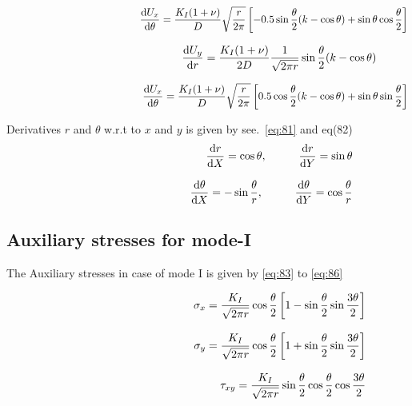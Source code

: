 \documentclass[fleqn, 12.5pt,a4paper]{report}
\newcommand\tab[1][1cm]{\hspace*{#1}}
\begin{document}
\begin{align}\label{eq:78}
\hspace{4.5cm}\dv{U_x}{\theta} = \frac{K_I(1+\nu)}{D} \sqrt{\frac{r}{2\pi}} \left[-0.5\sin\frac{\theta}{2} (k-\cos\theta) + \sin\theta \cos\frac{\theta}{2} \right]
\end{align}

\begin{align}\label{eq:79}
\hspace{4.5cm}\dv{U_y}{r} = \frac{K_I(1+\nu)}{2D} \frac{1}{\sqrt{2\pi r}} \sin\frac{\theta}{2} (k-\cos\theta)
\end{align}

\begin{align}\label{eq:80}
\hspace{4.5cm}\dv{U_x}{\theta} = \frac{K_I(1+\nu)}{D} \sqrt{\frac{r}{2\pi}} \left[0.5\cos\frac{\theta}{2} (k-\cos\theta) + \sin\theta \sin\frac{\theta}{2} \right]
\end{align}

Derivatives $r$ and $\theta$ w.r.t to $x$ and $y$ \cite{khoei2014extended} is given by see.~\autoref{eq:81} and eq(82)
\begin{align}\label{eq:81}
\hspace{4.5cm}\dv{r}{X} = \cos\theta, \tab[1cm] \dv{r}{Y} = \sin\theta \\[8pt]
\dv{\theta}{X} = -\sin\frac{\theta}{r}, \tab[1cm] \dv{\theta}{Y} = \cos\frac{\theta}{r}
\end{align}

\subsection{Auxiliary stresses for mode-I}
The Auxiliary stresses in case of mode I is given by \autoref{eq:83} to \autoref{eq:86} \cite{khoei2014extended}

\begin{align}\label{eq:83}
\hspace{4.5cm}\sigma_{x} = \frac{K_I}{\sqrt{2\pi r}} \cos\frac{\theta}{2} \left[1-\sin\frac{\theta}{2} \sin\frac{3\theta}{2}\right]\\[8pt]
\sigma_{y} = \frac{K_I}{\sqrt{2\pi r}} \cos\frac{\theta}{2} \left[1+\sin\frac{\theta}{2} \sin\frac{3\theta}{2}\right]\\[8pt]
\tau_{xy} = \frac{K_I}{\sqrt{2\pi r}} \sin\frac{\theta}{2} \cos\frac{\theta}{2} \cos\frac{3\theta}{2}
\end{align}
\end{document}
